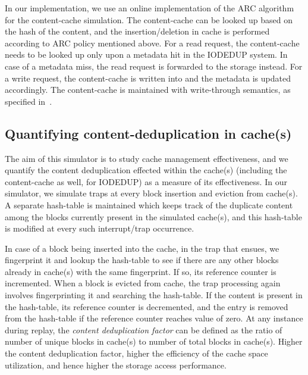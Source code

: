 In our implementation, we use an online implementation of the ARC
algorithm for the content-cache simulation. The content-cache can
be looked up based on the hash of the content, and the insertion/deletion
in cache is performed according to ARC policy mentioned above.
For a read request, the content-cache needs to be looked up only
upon a metadata hit in the IODEDUP system. In case of a metadata
miss, the read request is forwarded to the storage instead.
For a write request, the content-cache is written into and the
metadata is updated accordingly. The content-cache is maintained
with write-through semantics, as specified in~\cite{iodedup}.

\subsection{Quantifying content-deduplication in cache(s)}
The aim of this simulator is to study cache management effectiveness,
and we quantify the content deduplication effected within the cache(s) 
(including the content-cache as well, for IODEDUP)
as a measure of its effectiveness. In our simulator, we simulate 
traps at every block insertion and eviction from cache(s).
A separate hash-table is maintained which keeps track of the duplicate
content among the blocks currently present in the simulated cache(s), 
and this hash-table is modified at every such interrupt/trap occurrence.

In case of a block being inserted into the cache, in the trap
that ensues, we fingerprint it 
and lookup the hash-table to see if there are any other blocks already
in cache(s) with the same fingerprint. If so, its reference counter is
incremented. When a block is evicted from cache, the trap processing
again involves fingerprinting it and searching the hash-table. If
the content is present in the hash-table, its reference counter is 
decremented, and the entry is removed from the hash-table if the 
reference counter reaches value of zero.
At any instance during replay, the \textit{content deduplication factor}
can be defined as the ratio of number of unique blocks in cache(s) to 
number of total blocks in cache(s). Higher the content deduplication
factor, higher the efficiency of the cache space utilization, and hence
higher the storage access performance.



